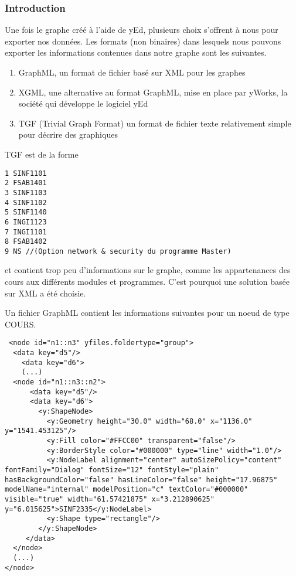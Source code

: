 \subsubsection{Introduction}
\label{graph_format_justification}
Une fois le graphe créé à l'aide de yEd, plusieurs choix s'offrent à nous pour exporter nos données. Les formats (non binaires) dans lesquels nous pouvons exporter les informations contenues dans notre graphe sont les suivantes. 
\begin{enumerate}
\item GraphML, un format de fichier basé sur XML pour les graphes
\item XGML, une alternative au format GraphML, mise en place par yWorks, la société qui développe le logiciel yEd
\item TGF (Trivial Graph Format) un format de fichier texte relativement simple pour décrire des graphiques
\end{enumerate}

TGF est de la forme

\begin{lstlisting}
1 SINF1101
2 FSAB1401
3 SINF1103
4 SINF1102
5 SINF1140
6 INGI1123
7 INGI1101
8 FSAB1402
9 NS //(Option network & security du programme Master)
\end{lstlisting}

et contient trop peu d'informations sur le graphe, comme les appartenances des cours aux différents modules et programmes. C'est pourquoi une solution basée sur XML a été choisie.

Un fichier GraphML contient les informations suivantes pour un noeud de type COURS.

\begin{lstlisting}
 <node id="n1::n3" yfiles.foldertype="group">
  <data key="d5"/>
    <data key="d6">
    (...)
  <node id="n1::n3::n2">
      <data key="d5"/>
      <data key="d6">
        <y:ShapeNode>
          <y:Geometry height="30.0" width="68.0" x="1136.0" y="1541.453125"/>
          <y:Fill color="#FFCC00" transparent="false"/>
          <y:BorderStyle color="#000000" type="line" width="1.0"/>
          <y:NodeLabel alignment="center" autoSizePolicy="content" fontFamily="Dialog" fontSize="12" fontStyle="plain" hasBackgroundColor="false" hasLineColor="false" height="17.96875" modelName="internal" modelPosition="c" textColor="#000000" visible="true" width="61.57421875" x="3.212890625" y="6.015625">SINF2335</y:NodeLabel>
          <y:Shape type="rectangle"/>
        </y:ShapeNode>
     </data>
  </node>
  (...)
</node>
\end{lstlisting}

